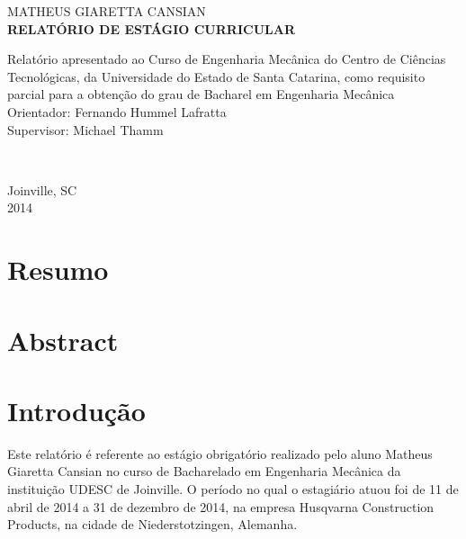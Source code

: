 \documentclass[12pt]{article}
\begin{document}
	\begin{titlepage}
		\begin{center}
			{\fontsize{16pt}{\baselineskip}\fontfamily{\familydefault}\selectfont MATHEUS GIARETTA CANSIAN}\\[6cm]
			{\fontsize{18pt}{\baselineskip}\fontfamily{\familydefault}\selectfont \bf RELATÓRIO DE ESTÁGIO CURRICULAR}\\[5.5cm]
		\end{center}
		
		{
			\fontsize{14pt}{\baselineskip} \fontfamily{\familydefault} \selectfont
			
			\hspace{.45\textwidth} \begin{minipage}{.5\textwidth}
				\noindent 
				Relatório apresentado ao Curso de Engenharia Mecânica do Centro de Ciências Tecnológicas, 
				da Universidade do Estado de Santa Catarina, 
				como requisito parcial para a obtenção do grau de Bacharel em Engenharia Mecânica\\[0.6cm]
				Orientador: Fernando Hummel Lafratta\\[0.1cm]
				Supervisor: Michael Thamm
			\end{minipage}
		}\\[2.5cm]
		
		
		\begin{center}
		{
			\fontsize{14pt}{\baselineskip} \fontfamily{\familydefault} \selectfont
			Joinville, SC\\[0.2cm]
			2014
		}
		\end{center}
	\end{titlepage}

\onehalfspacing

\tableofcontents
\pagebreak

\listoffigures
\pagebreak

\section{Resumo}
\pagebreak

\section{Abstract}
\pagebreak


\section{Introdução}
	Este relatório é referente ao estágio obrigatório realizado pelo aluno Matheus Giaretta Cansian no curso de Bacharelado em Engenharia Mecânica da instituição UDESC de Joinville.
	O período no qual o estagiário atuou foi de 11 de abril de 2014 a 31 de dezembro de 2014, na empresa Husqvarna Construction Products, na cidade de Niederstotzingen, Alemanha.
\pagebreak
\end{document}
